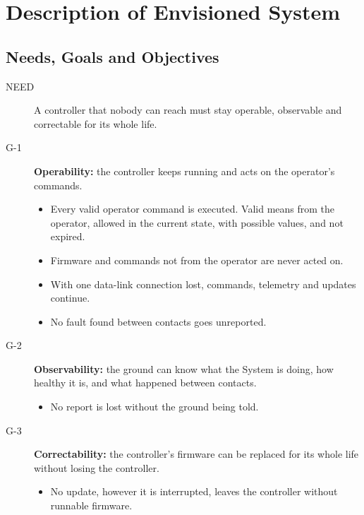 \documentclass[11pt,a4paper]{article}
\begin{document}
\section{Description of Envisioned System}

\subsection{Needs, Goals and Objectives}
\label{sec:ngo}
\begin{description}
\item[NEED] A controller that nobody can reach must stay operable, observable
  and correctable for its whole life.
\item[G-1] \textbf{Operability:} the controller keeps running and acts on the
  operator's commands.
  \begin{itemize}[leftmargin=1.2cm]
  \item[\textbf{O-1}] Every valid operator command is executed. Valid means from the
    operator, allowed in the current state, with possible values, and not
    expired.
  \item[\textbf{O-2}] Firmware and commands not from the operator are never acted on.
  \item[\textbf{O-3}] With one data-link connection lost, commands, telemetry and
    updates continue.
  \item[\textbf{O-4}] No fault found between contacts goes unreported.
  \end{itemize}
\item[G-2] \textbf{Observability:} the ground can know what the System is
  doing, how healthy it is, and what happened between contacts.
  \begin{itemize}[leftmargin=1.2cm]
  \item[\textbf{O-5}] No report is lost without the ground being told.
  \end{itemize}
\item[G-3] \textbf{Correctability:} the controller's firmware can be replaced
  for its whole life without losing the controller.
  \begin{itemize}[leftmargin=1.2cm]
  \item[\textbf{O-6}] No update, however it is interrupted, leaves the
    controller without runnable firmware.
  \end{itemize}
\end{description}
\end{document}
